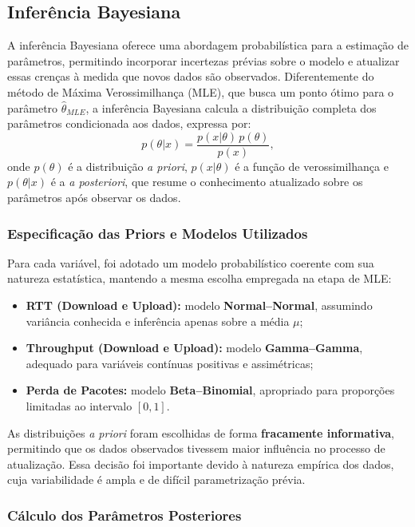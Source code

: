 \documentclass{article}
\begin{document}
\subsection{Inferência Bayesiana}

A inferência Bayesiana oferece uma abordagem probabilística para a estimação de parâmetros,
permitindo incorporar incertezas prévias sobre o modelo e atualizar essas crenças à medida
que novos dados são observados. Diferentemente do método de Máxima Verossimilhança (MLE),
que busca um ponto ótimo para o parâmetro $\hat{\theta}_{MLE}$, a inferência Bayesiana
calcula a distribuição completa dos parâmetros condicionada aos dados, expressa por:
\begin{equation}
	p(\theta | x) = \frac{p(x | \theta) \, p(\theta)}{p(x)},
\end{equation}
onde $p(\theta)$ é a distribuição \textit{a priori}, $p(x|\theta)$ é a função de
verossimilhança e $p(\theta|x)$ é a \textit{a posteriori}, que resume o conhecimento atualizado
sobre os parâmetros após observar os dados.

\subsubsection{Especificação das Priors e Modelos Utilizados}

Para cada variável, foi adotado um modelo probabilístico coerente com sua natureza estatística,
mantendo a mesma escolha empregada na etapa de MLE:
\begin{itemize}
	\item \textbf{RTT (Download e Upload):} modelo \textbf{Normal–Normal}, assumindo variância
	conhecida e inferência apenas sobre a média $\mu$;
	\item \textbf{Throughput (Download e Upload):} modelo \textbf{Gamma–Gamma}, adequado para
	variáveis contínuas positivas e assimétricas;
	\item \textbf{Perda de Pacotes:} modelo \textbf{Beta–Binomial}, apropriado para proporções
	limitadas ao intervalo $[0, 1]$.
\end{itemize}

As distribuições \textit{a priori} foram escolhidas de forma \textbf{fracamente informativa},
permitindo que os dados observados tivessem maior influência no processo de atualização.
Essa decisão foi importante devido à natureza empírica dos dados, cuja variabilidade é ampla
e de difícil parametrização prévia.

\subsubsection{Cálculo dos Parâmetros Posteriores}
\end{document}
